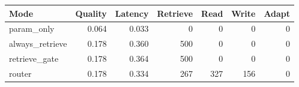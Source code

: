 \begin{tabular}{lrrrrrr}
\toprule
Mode & Quality & Latency & Retrieve & Read & Write & Adapt \\
\midrule
param\_only & 0.064 & 0.033 & 0 & 0 & 0 & 0 \\
always\_retrieve & 0.178 & 0.360 & 500 & 0 & 0 & 0 \\
retrieve\_gate & 0.178 & 0.364 & 500 & 0 & 0 & 0 \\
router & 0.178 & 0.334 & 267 & 327 & 156 & 0 \\
\bottomrule
\end{tabular}

